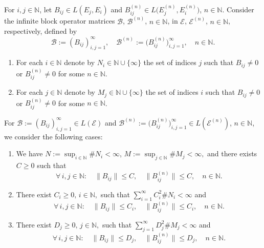 \documentclass[a4paper,reqno]{amsart}
\begin{document}
\begin{notation}\label{defcBcBn}
For $i,j\in{\mathbb{N}}$, let $B_{ij}\in L(E_j,E_i)$ and $B_{ij}^{(n)}\in L\big(E_j^{(n)},E_i^{(n)}\big)$, $n\in{\mathbb{N}}$.
Consider the infinite block operator matrices ${\mathcal B}$, ${\mathcal B}^{(n)}$, $n\in{\mathbb{N}}$, in ${\mathcal E}$, ${\mathcal E}^{(n)}$, $n\in{\mathbb{N}}$, respectively, defined by $$ {\mathcal B}:=(B_{ij})_{i,j=1}^{\infty}, \quad {\mathcal B}^{(n)}:=\big(B_{ij}^{(n)}\big)_{i,j=1}^{\infty}, \quad n\in{\mathbb{N}}.$$
\begin{enumerate}[label=\rm{\roman{*})}]
\item For each $i\in{\mathbb{N}}$ denote by $N_i\in{\mathbb{N}}\cup\{\infty\}$ the set of indices 
$j$ such that $B_{ij}\neq 0$ or $B_{ij}^{(n)}\neq 0$ for some $n\in{\mathbb{N}}$.
\item
For each $j\in{\mathbb{N}}$ denote by $M_j\in{\mathbb{N}}\cup\{\infty\}$ the set of indices 
$i$ such that $B_{ij}\neq 0$ or $B_{ij}^{(n)}\neq 0$ for some $n\in{\mathbb{N}}$.
\end{enumerate}
\end{notation}

For ${\mathcal B}:=(B_{ij})_{i,j=1}^{\infty}\in L({\mathcal E})$ and ${\mathcal B}^{(n)}:=\big(B_{ij}^{(n)}\big)_{i,j=1}^{\infty}\in L({\mathcal E}^{(n)})$, $n\in{\mathbb{N}}$, we consider the following cases:
\begin{enumerate}[label=\rm{(\alph{*})}]
\item \label{casetridiag}
We have $N:=\sup_{i\in{\mathbb{N}}} \#N_i<\infty$, $M:=\sup_{j\in{\mathbb{N}}} \#M_j<\infty,$
and there exists $C\geq 0$ such that 
$$\forall\,i,j\in{\mathbb{N}}:\quad \big\| B_{ij}\big\|\leq C, \quad \big\|B_{ij}^{(n)}\big\|\leq C, \quad n\in{\mathbb{N}}.$$

\item \label{casenontridiag}
There exist $C_i\geq 0, \,i\in{\mathbb{N}},$ such that 
$\sum_{i=1}^{\infty}C_i^2 \#N_i<\infty$
and
$$\forall\,i,j\in{\mathbb{N}}:\quad  \big\| B_{ij}\big\|\leq C_i, \quad \big\|B_{ij}^{(n)}\big\|\leq C_i, \quad n\in{\mathbb{N}}.$$

\item \label{casenontridiag2}
There exist $D_j\geq 0, \,j\in{\mathbb{N}},$ such that 
$\sum_{j=1}^{\infty}D_j^2 \#M_j<\infty$ and
$$\forall\,i,j\in{\mathbb{N}}:\quad \big\| B_{ij}\big\|\leq D_j, \quad \big\|B_{ij}^{(n)}\big\|\leq D_j, \quad n\in{\mathbb{N}}.$$
\end{enumerate}
\end{document}
